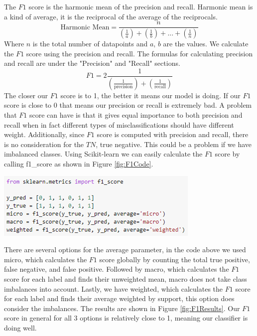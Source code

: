 \documentclass[a4paper,12pt]{report}
\begin{document}
The $F1$ score is the harmonic mean of the precision and recall. Harmonic mean is a kind of average, it is the reciprocal of the average of the reciprocals.
$$\text{Harmonic Mean}=\frac{n}{(\frac{1}{a})+(\frac{1}{b})+...+(\frac{1}{n})}$$
Where $n$ is the total number of datapoints and $a$, $b$ are the values.
We calculate the $F1$ score using the precision and recall. The formulas for calculating precision and recall are under the "Precision" and "Recall" sections. 
$$F1=2\frac{1}{(\frac{1}{\text{precision}})+(\frac{1}{\text{recall}})}$$
The closer our $F1$ score is to 1, the better it means our model is doing. If our $F1$ score is close to 0 that means our precision or recall is extremely bad. A problem that $F1$ score can have is that it gives equal importance to both precision and recall when in fact different types of misclassifications should have different weight. Additionally, since $F1$ score is computed with precision and recall, there is no consideration for the $TN$, true negative. This could be a problem if we have imbalanced classes. Using Scikit-learn we can easily calculate the $F1$ score by calling f1\_score as shown in Figure \ref{fig:F1Code}.

\begin{center}
    \captionsetup{type=figure}
    \includegraphics[width=.9\linewidth]{media/F1Code.png}
    \label{fig:F1Code}
\end{center}

There are several options for the average parameter, in the code above we used micro, which calculates the $F1$ score globally by counting the total true positive, false negative, and false positive. Followed by macro, which calculates the $F1$ score for each label and finds their unweighted mean, macro does not take class imbalances into account. Lastly, we have weighted, which calculates the $F1$ score for each label and finds their average weighted by support, this option does consider the imbalances. The results are shown in Figure \ref{fig:F1Results}. Our $F1$ score in general for all 3 options is relatively close to 1, meaning our classifier is doing well.
\end{document}
